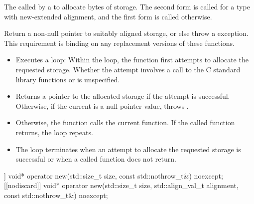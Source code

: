 \begin{itemdescr}
\pnum
\effects
The
called by a
to allocate
 bytes of storage.
The second form is called for a type with new-extended alignment, and
the first form is called otherwise.

\pnum
\replaceable
{}

\pnum
\required
Return a non-null pointer to suitably aligned storage,
or else throw a
%
exception.
This requirement is binding on any replacement versions of these functions.

\pnum
{}

\begin{itemize}
\item
Executes a loop:
Within the loop, the function first attempts to allocate the requested storage.
Whether the attempt involves a call to the C standard library functions
 or 
is unspecified.
%
\item
Returns a pointer to the allocated storage if the attempt is successful.
Otherwise, if the
current  is
a null pointer value, throws
.
\item
Otherwise, the function calls the current
 function.
If the called function returns, the loop repeats.
\item
The loop terminates when an attempt to allocate the requested storage is
successful or when a called
function does not return.
\end{itemize}
\end{itemdescr}

%
\begin{itemdecl}
[[nodiscard]] void* operator new(std::size_t size, const std::nothrow_t&) noexcept;
[[nodiscard]] void* operator new(std::size_t size, std::align_val_t alignment,
                                 const std::nothrow_t&) noexcept;
\end{itemdecl}


